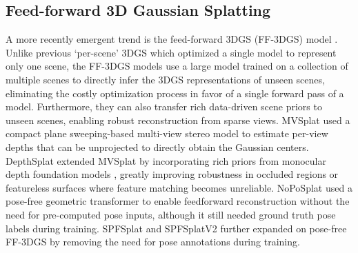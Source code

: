 \documentclass[runningheads]{llncs}
\begin{document}
\subsection{Feed-forward 3D Gaussian Splatting}
\label{sec:rel-works-ff-3dgs}
A more recently emergent trend is the feed-forward 3DGS (FF-3DGS) model \cite{charatan2024pixelsplat, szymanowicz2024splatter, chen2024mvsplat, chen2024mvsplat360, xu2025depthsplat, kang2025ilrm, zhang2024gs, tang2024lgm}. Unlike previous `per-scene' 3DGS which optimized a single model to represent only one scene, the FF-3DGS models use a large model trained on a collection of multiple scenes to directly infer the 3DGS representations of unseen scenes, eliminating the costly optimization process in favor of a single forward pass of a model. Furthermore, they can also transfer rich data-driven scene priors to unseen scenes, enabling robust reconstruction from sparse views.
MVSplat \cite{chen2024mvsplat} used a compact plane sweeping-based multi-view stereo model to estimate per-view depths that can be unprojected to directly obtain the Gaussian centers. DepthSplat \cite{xu2025depthsplat} extended MVSplat by incorporating rich priors from monocular depth foundation models \cite{yang2024depth}, greatly improving robustness in occluded regions or featureless surfaces where feature matching becomes unreliable. NoPoSplat \cite{ye2024no} used a pose-free geometric transformer \cite{wang2024dust3r, leroy2024grounding} to enable feedforward reconstruction without the need for pre-computed pose inputs, although it still needed ground truth pose labels during training. SPFSplat \cite{huang2025no} and SPFSplatV2 \cite{huang2025spfsplatv2} further expanded on pose-free FF-3DGS by removing the need for pose annotations during training.

 
\end{document}
